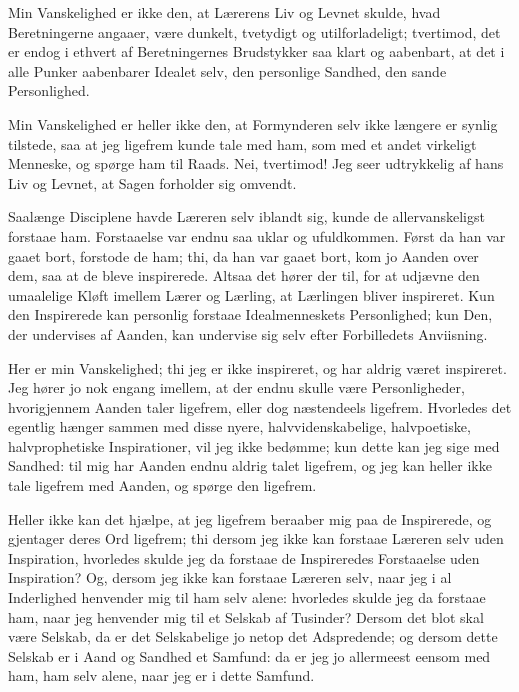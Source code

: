 \documentclass[12pt,a4paper]{book}
\newcommand{\apage}[1]{\marginnote{\footnotesize\textit{[#1]}}}
\begin{document}
Min Vanskelighed er ikke den, at Lærerens Liv og Levnet skulde, hvad
Beretningerne angaaer, være dunkelt, tvetydigt og utilforladeligt;
tvertimod, det er endog i ethvert af Beretningernes Brudstykker saa klart og
aabenbart, at det i alle Punker aabenbarer Idealet selv, den personlige
Sandhed, den sande Personlighed.

Min Vanskelighed er heller ikke den, at Formynderen selv ikke længere er
synlig tilstede, saa at jeg ligefrem kunde tale med ham, som med et andet
virkeligt Menneske, og spørge ham til Raads. Nei, tvertimod! Jeg seer
udtrykkelig af hans Liv og Levnet, at Sagen forholder sig omvendt.

Saalænge Disciplene havde Læreren selv iblandt sig, kunde de allervanskeligst
forstaae ham. Forstaaelse var endnu saa uklar og ufuldkommen. Først da han
var gaaet bort, forstode de ham; thi, da han var gaaet bort, kom jo Aanden
over dem, saa at de bleve inspirerede. Altsaa det hører der til, for at
udjævne den umaalelige Kløft imellem Lærer og Lærling, at Lærlingen bliver
inspireret. Kun den Inspirerede kan personlig forstaae Idealmenneskets
Personlighed; kun Den, der undervises af Aanden, kan undervise sig selv
efter Forbilledets Anviisning.
 \apage{108}

Her er min Vanskelighed; thi jeg er ikke inspireret, og har aldrig været
inspireret. Jeg hører jo nok engang imellem, at der endnu skulle være
Personligheder, hvorigjennem Aanden taler ligefrem, eller dog næstendeels
ligefrem. Hvorledes det egentlig hænger sammen med disse nyere,
halvvidenskabelige, halvpoetiske, halvprophetiske Inspirationer, vil jeg
ikke bedømme; kun dette kan jeg sige med Sandhed: til mig har Aanden endnu
aldrig talet ligefrem, og jeg kan heller ikke tale ligefrem med Aanden, og
spørge den ligefrem.

Heller ikke kan det hjælpe, at jeg ligefrem beraaber mig paa de Inspirerede,
og gjentager deres Ord ligefrem; thi dersom jeg ikke kan forstaae Læreren
selv uden Inspiration, hvorledes skulde jeg da forstaae de Inspireredes
Forstaaelse uden Inspiration? Og, dersom jeg ikke kan forstaae Læreren selv,
naar jeg i al Inderlighed henvender mig til ham selv alene: hvorledes
skulde jeg da forstaae ham, naar jeg henvender mig til et Selskab af
Tusinder? Dersom det blot skal være Selskab, da er det Selskabelige jo
netop det Adspredende; og dersom dette Selskab er i Aand og Sandhed et
Samfund: da er jeg jo allermeest eensom med ham, ham selv alene, naar jeg er
i dette Samfund.
\end{document}
